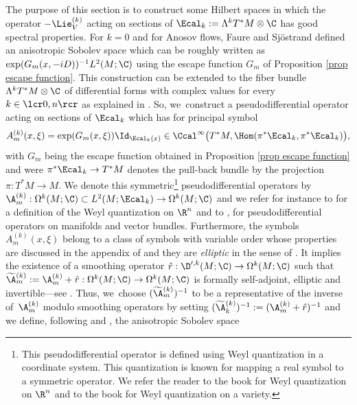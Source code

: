 The purpose of this section is to construct some Hilbert spaces in which the operator $-\Lie_V^{(k)}$ acting on sections of $\Ecal_k:= \Lambda^k T^*M \otimes \C$ has good spectral properties. For $k = 0$ and for Anosov flows, Faure and Sjöstrand defined an anisotropic Sobolev space which can be roughly written as $\exp (G_m (x,-iD))^{-1} L^2 (M ; \C)$ using the escape function $G_m$ of Proposition \ref{prop escape function}. This construction can be extended to the fiber bundle $ \Lambda^k T^*M \otimes \C$ of differential forms with complex values for every $k\in\lcr0,n\rcr$ as explained in \cite{dyatlov-zworski}. So, we~construct a pseudodifferential operator acting on sections of $\Ecal_k$ which has for principal symbol\enlargethispage{\baselineskip}
\[
A_m^{(k)} (x,\xi) = \exp (G_m (x,\xi))\Id_{\Ecal_k (x)} \in \Ccal^{\infty} \bigl(T^*M, \Hom (\pi^* \Ecal_k, \pi^* \Ecal_k) \bigr),
\]
with $G_m$ being the escape function obtained in Proposition \ref{prop escape function} and were $\pi^* \Ecal_k \to T^* M$ denotes the pull-back bundle by the projection $\pi: T^* M \to M$. We denote this symmetric\footnote{This pseudodifferential operator is defined using Weyl quantization in a coordinate system. This quantization is known for mapping a real symbol to a symmetric operator. We refer the reader to the book \cite[Chap.\,4, Th.\,4.1]{zworski} for Weyl quantization on $\R^n$ and to the book \cite[App.\,E]{DZ-book} for Weyl quantization on a variety.} pseudodifferential operators by $\A_m^{(k)}: \Omega^k (M ; \C) \subset L^2 (M; \Ecal_k) \to \Omega^k (M ; \C) $ and we refer for instance to \cite[Chap.\,4, p.\,56]{zworski} for a definition of the Weyl quantization on $\R^n$ and to \cite[App.\,C.1, p.\,29]{dyatlov-zworski},\cite[\S 9.2 p.\,40]{DRI} for pseudodifferential operators on manifolds and vector bundles. Furthermore, the symbols $A_m^{(k)} (x,\xi) $ belong to a class of symbols with variable order whose properties are discussed in the appendix of \cite{FRS} and they are \emph{elliptic} in the sense of \cite[Def.\,8, p.\,40]{FRS}. It implies the existence of a smoothing operator $\hat{r}: \D'^{,k} (M;\C) \to \Omega^k (M; \C)$ such that $\widetilde{\A}{}_m^{(k)}:= \A_m^{(k)} + \hat{r}: \Omega^k (M; \C) \to \Omega^k (M; \C)$ is formally self-adjoint, elliptic and invertible---see \cite[Lem.\,12, p.\,42]{FRS}. Thus, we~choose $(\widetilde{\A}{}_m^{(k)})^{-1}$ to be a representative of the inverse of~$\A_m^{(k)}$ modulo smoothing operators by setting $(\widetilde{\A}{}_k^{(k)})^{-1}:= (\A_m^{(k)} + \hat{r})^{-1}$ and we define, following \cite{FRS} and \cite{FS}, the anisotropic Sobolev space
